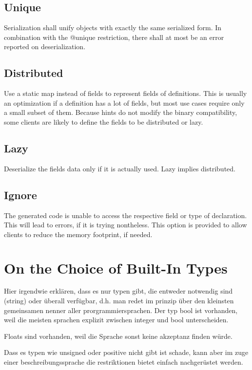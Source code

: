 \documentclass[a4paper,10pt]{article}
\begin{document}
\subsection*{Unique}
Serialization shall unify objects with exactly the same serialized form. In combination with the @unique restriction, there shall at most be an error reported on deserialization.

\subsection*{Distributed}
Use a static map instead of fields to represent fields of definitions. This is usually an optimization if a definition has a lot of fields, but most use cases require only a small subset of them. Because hints do not modify the binary compatibility, some clients are likely to define the fields to be distributed or lazy.

\subsection*{Lazy}
Deserialize the fields data only if it is actually used. Lazy implies distributed.

\subsection*{Ignore}
The generated code is unable to access the respective field or type of declaration. This will lead to errors, if it is trying nontheless. This option is provided to allow clients to reduce the memory footprint, if needed.

\section{On the Choice of Built-In Types}

Hier irgendwie erklären, dass es nur typen gibt, die entweder notwendig sind (string) oder überall verfügbar, d.h. man redet im prinzip über den kleinsten gemeinsamen nenner aller prorgrammiersprachen. Der typ bool ist vorhanden, weil die meisten sprachen explizit zwischen integer und bool unterscheiden.

Floats sind vorhanden, weil die Sprache sonst keine akzeptanz finden würde.

Dass es typen wie unsigned oder positive nicht gibt ist schade, kann aber im zuge einer beschreibungssprache die restriktionen bietet einfach nachgerüstet werden.
\end{document}
